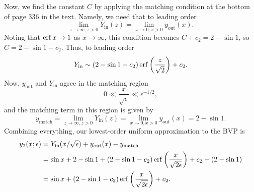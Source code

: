 \documentclass{article}
\begin{document}
Now, we find the constant $C$ by applying the matching condition at the bottom of page 336 in the text. Namely, we need that to leading order
\[
\lim_{z\to\infty,z>0}Y_{\text{in}}(z)=\lim_{x\to0,x>0}y_{\text{out}}(x).
\]
Noting that $\operatorname{erf} x\to1$ as $x\to\infty$, this condition becomes $C+c_2=2-\sin1$, so $C=2-\sin1-c_2$. Thus, to leading order
\[
Y_{\text{in}}\sim (2-\sin1-c_2)\operatorname{erf}\left(\frac{z}{\sqrt{2}}\right)+c_2.
\]
Now, $y_{\text{out}}$ and $Y_{\text{in}}$ agree in the matching region 
\[
0\ll\frac{x}{\sqrt{\epsilon}}\ll\epsilon^{-1/2},
\]
and the matching term in this region is given by 
\[
y_{\text{match}}=\lim_{z\to\infty,z>0}Y_{\text{in}}(z)=\lim_{x\to0,x>0}y_{\text{out}}(x)=2-\sin1.
\]
Combining everything, our lowest-order uniform approximation to the BVP is
\begin{align*}
y_2(x;\epsilon)&=Y_{\text{in}}(x/\sqrt{\epsilon})+y_{\text{out}}(x)-y_{\text{match}}\\&=\sin x+2-\sin1+(2-\sin1-c_2)\operatorname{erf}\left(\frac{x}{\sqrt{2\epsilon}}\right)+c_2-(2-\sin1)\\&=
\sin x+(2-\sin1-c_2)\operatorname{erf}\left(\frac{x}{\sqrt{2\epsilon}}\right)+c_2.
\end{align*}
\end{document}
